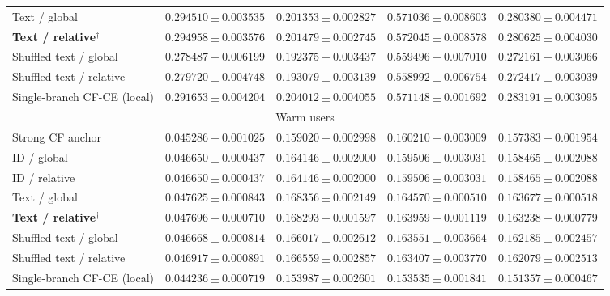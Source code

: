 \begin{table}[t]
\begin{tabular}{lcccc}
Text / global & $0.294510 \pm 0.003535$ & $0.201353 \pm 0.002827$ & $0.571036 \pm 0.008603$ & $0.280380 \pm 0.004471$ \\
\textbf{Text / relative}$^{\dagger}$ & $0.294958 \pm 0.003576$ & $0.201479 \pm 0.002745$ & $0.572045 \pm 0.008578$ & $0.280625 \pm 0.004030$ \\
Shuffled text / global & $0.278487 \pm 0.006199$ & $0.192375 \pm 0.003437$ & $0.559496 \pm 0.007010$ & $0.272161 \pm 0.003066$ \\
Shuffled text / relative & $0.279720 \pm 0.004748$ & $0.193079 \pm 0.003139$ & $0.558992 \pm 0.006754$ & $0.272417 \pm 0.003039$ \\
Single-branch CF-CE (local) & $0.291653 \pm 0.004204$ & $0.204012 \pm 0.004055$ & $0.571148 \pm 0.001692$ & $0.283191 \pm 0.003095$ \\
\midrule
\multicolumn{5}{c}{Warm users} \\
\midrule
Strong CF anchor & $0.045286 \pm 0.001025$ & $0.159020 \pm 0.002998$ & $0.160210 \pm 0.003009$ & $0.157383 \pm 0.001954$ \\
ID / global & $0.046650 \pm 0.000437$ & $0.164146 \pm 0.002000$ & $0.159506 \pm 0.003031$ & $0.158465 \pm 0.002088$ \\
ID / relative & $0.046650 \pm 0.000437$ & $0.164146 \pm 0.002000$ & $0.159506 \pm 0.003031$ & $0.158465 \pm 0.002088$ \\
Text / global & $0.047625 \pm 0.000843$ & $0.168356 \pm 0.002149$ & $0.164570 \pm 0.000510$ & $0.163677 \pm 0.000518$ \\
\textbf{Text / relative}$^{\dagger}$ & $0.047696 \pm 0.000710$ & $0.168293 \pm 0.001597$ & $0.163959 \pm 0.001119$ & $0.163238 \pm 0.000779$ \\
Shuffled text / global & $0.046668 \pm 0.000814$ & $0.166017 \pm 0.002612$ & $0.163551 \pm 0.003664$ & $0.162185 \pm 0.002457$ \\
Shuffled text / relative & $0.046917 \pm 0.000891$ & $0.166559 \pm 0.002857$ & $0.163407 \pm 0.003770$ & $0.162079 \pm 0.002513$ \\
Single-branch CF-CE (local) & $0.044236 \pm 0.000719$ & $0.153987 \pm 0.002601$ & $0.153535 \pm 0.001841$ & $0.151357 \pm 0.000467$ \\
\bottomrule
\end{tabular}
\end{table}
